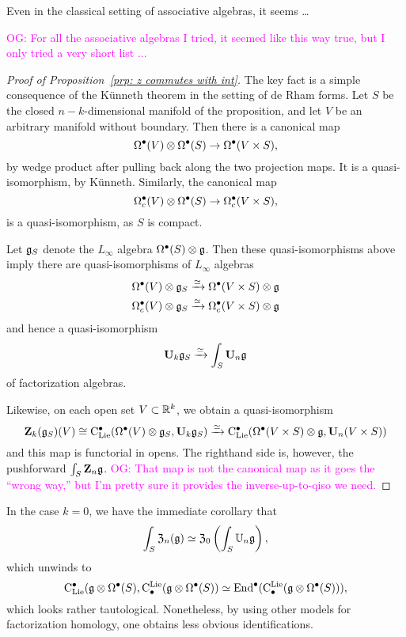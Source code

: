 \documentclass[11pt]{amsart}
\numberwithin{equation}{section}
\def\owen{\textcolor{magenta}{OG: }\textcolor{magenta}}
\begin{document}
Even in the classical setting of associative algebras, it seems \dots

\owen{For all the associative algebras I tried, it seemed like this way true, but I only tried a very short list ...}

\begin{proof}[Proof of Proposition~\ref{prp: z commutes with int}]
The key fact is a simple consequence of the K\"unneth theorem in the setting of de Rham forms.
Let $S$ be the closed $n-k$-dimensional manifold of the proposition,
and let $V$ be an arbitrary manifold without boundary.
Then there is a canonical map
\[
\Omega^\bullet(V) \otimes \Omega^\bullet(S) \to \Omega^\bullet(V \times S),
\]
by wedge product after pulling back along the two projection maps.
It is a quasi-isomorphism, by K\"unneth.
Similarly, the canonical map
\[
\Omega_c^\bullet(V) \otimes \Omega^\bullet(S) \to \Omega_c^\bullet(V \times S),
\]
is a quasi-isomorphism, as $S$ is compact.

Let $\mathfrak g_S$ denote the $L_\infty$ algebra $\Omega^\bullet(S) \otimes \mathfrak g$. 
Then these quasi-isomorphisms above imply there are quasi-isomorphisms of $L_\infty$ algebras
\begin{align*}
\Omega^\bullet(V) \otimes \mathfrak g_S &\xrightarrow{\simeq} \Omega^\bullet(V \times S) \otimes \mathfrak g \\
\Omega_c^\bullet(V) \otimes \mathfrak g_S &\xrightarrow{\simeq} \Omega_c^\bullet(V \times S) \otimes \mathfrak g 
\end{align*}
and hence a quasi-isomorphism
\[
\mathbf U_k \mathfrak g_S \xrightarrow{\simeq} \int_S \mathbf U_n \mathfrak g
\]
of factorization algebras.

Likewise, on each open set $V \subset \mathbb R^k$, 
we obtain a quasi-isomorphism
\[
\mathbf Z_k(\mathfrak g_S)(V) \cong {\rm C}_{\rm Lie}^\bullet( \Omega^\bullet(V) \otimes \mathfrak g_S, \mathbf U_k \mathfrak g_S) \xrightarrow{\simeq} {\rm C}_{\rm Lie}^\bullet(\Omega^\bullet(V \times S) \otimes \mathfrak g, \mathbf U_n(V \times S))
\]
and this map is functorial in opens.
The righthand side is, however, the pushforward $\int_S \mathbf Z_n \mathfrak g$.
\owen{That map is not the canonical map as it goes the ``wrong way,'' but I'm pretty sure it provides the inverse-up-to-qiso we need.}
\end{proof}

In the case $k = 0$, we have the immediate corollary that
\[
\int_{S} \mathfrak Z_n(\mathfrak g) \simeq \mathfrak Z_0 \left( \int_S \mathbb U_n \mathfrak g \right) ,
\]
which unwinds to 
\begin{equation}
\label{eqn: taut}
{\rm C}_{\rm Lie}^\bullet(\mathfrak g \otimes \Omega^\bullet(S), {\rm C}^{\rm Lie}_\bullet(\mathfrak g \otimes \Omega^\bullet(S)) \simeq {\rm End}^\bullet({\rm C}^{\rm Lie}_\bullet(\mathfrak g \otimes \Omega^\bullet(S))),
\end{equation}
which looks rather tautological.
Nonetheless, by using other models for factorization homology,
one obtains less obvious identifications.
\end{document}
